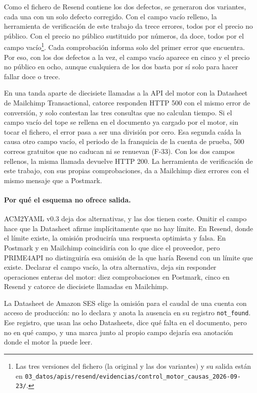 Como el fichero de Resend contiene los dos defectos, se generaron dos variantes, cada una con un solo defecto corregido.
Con el campo vacío relleno, la herramienta de verificación de este trabajo da trece errores, todos por el precio no público.
Con el precio no público sustituido por números, da doce, todos por el campo vacío\footnote{Las tres versiones del fichero (la original y las dos variantes) y su salida están en \texttt{03\_datos/\allowbreak apis/\allowbreak resend/\allowbreak evidencias/\allowbreak control\_motor\_causas\_2026-09-23/}.}.
Cada comprobación informa solo del primer error que encuentra.
Por eso, con los dos defectos a la vez, el campo vacío aparece en cinco y el precio no público en ocho, aunque cualquiera de los dos basta por sí solo para hacer fallar doce o trece.

En una tanda aparte de diecisiete llamadas a la API del motor con la Datasheet de Mailchimp Transactional, catorce responden HTTP 500 con el mismo error de conversión, y solo contestan las tres consultas que no calculan tiempo.
Si el campo vacío del tope se rellena en el documento ya cargado por el motor, sin tocar el fichero, el error pasa a ser una división por cero.
Esa segunda caída la causa otro campo vacío, el periodo de la franquicia de la cuenta de prueba, 500 correos gratuitos que no caducan ni se renuevan (F-33).
Con los dos campos rellenos, la misma llamada devuelve HTTP 200.
La herramienta de verificación de este trabajo, con sus propias comprobaciones, da a Mailchimp diez errores con el mismo mensaje que a Postmark.

\paragraph{Por qué el esquema no ofrece salida.}
ACM2YAML v0.3 deja dos alternativas, y las dos tienen coste.
Omitir el campo hace que la Datasheet afirme implícitamente que no hay límite.
En Resend, donde el límite existe, la omisión produciría una respuesta optimista y falsa.
En Postmark y en Mailchimp coincidiría con lo que dice el proveedor, pero PRIME4API no distinguiría esa omisión de la que haría Resend con un límite que existe.
Declarar el campo vacío, la otra alternativa, deja sin responder operaciones enteras del motor: diez comprobaciones en Postmark, cinco en Resend y catorce de diecisiete llamadas en Mailchimp.

La Datasheet de Amazon SES elige la omisión para el caudal de una cuenta con acceso de producción: no lo declara y anota la ausencia en su registro \texttt{not\_found}.
Ese registro, que usan las ocho Datasheets, dice qué falta en el documento, pero no en qué campo, y una marca junto al propio campo dejaría esa anotación donde el motor la puede leer.

